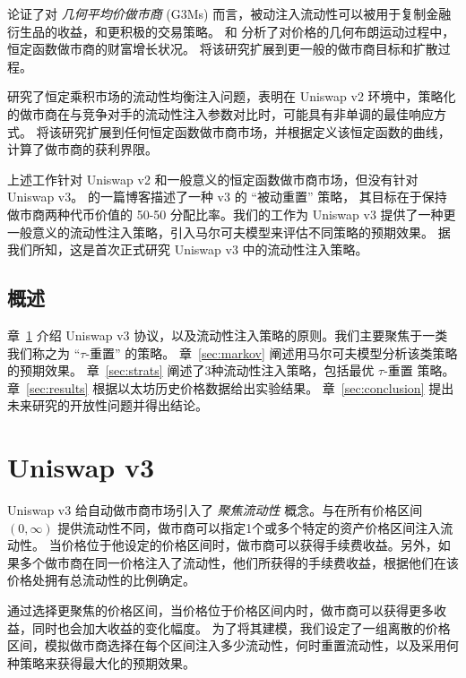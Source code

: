 \documentclass[sigconf, dvipsnames]{acmart}
\begin{document}
\citet{evans2020liquidity} 论证了对 {\em 几何平均价做市商} (G3Ms) 而言，被动注入流动性可以被用于复制金融衍生品的收益，和更积极的交易策略。
\citet{tassy2020growth} 和 \citet{uniswapsfinancialalchemy} 分析了对价格的几何布朗运动过程中，恒定函数做市商的财富增长状况。
\citet{evans2021optimal} 将该研究扩展到更一般的做市商目标和扩散过程。

\citet{aoyagi2020lazy} 研究了恒定乘积市场的流动性均衡注入问题，表明在 Uniswap v2 环境中，策略化的做市商在与竞争对手的流动性注入参数对比时，可能具有非单调的最佳响应方式。
\citet{angeris2020does} 将该研究扩展到任何恒定函数做市商市场，并根据定义该恒定函数的曲线，计算了做市商的获利界限。

上述工作针对 Uniswap v2 和一般意义的恒定函数做市商市场，但没有针对 Uniswap v3。\citet{charmalphavault} 的一篇博客描述了一种 v3 的 ``被动重置'' 策略，
其目标在于保持做市商两种代币价值的 50-50 分配比率。我们的工作为 Uniswap v3 提供了一种更一般意义的流动性注入策略，引入马尔可夫模型来评估不同策略的预期效果。
据我们所知，这是首次正式研究 Uniswap v3 中的流动性注入策略。

\subsection{概述}
\quad 章~\ref{sec:uniswap} 介绍 Uniswap v3 协议，以及流动性注入策略的原则。我们主要聚焦于一类我们称之为 ``$\tau$-重置'' 的策略。
章~\ref{sec:markov} 阐述用马尔可夫模型分析该类策略的预期效果。
章~\ref{sec:strats} 阐述了3种流动性注入策略，包括最优 $\tau$-重置 策略。
章~\ref{sec:results} 根据以太坊历史价格数据给出实验结果。
章~\ref{sec:conclusion} 提出未来研究的开放性问题并得出结论。

\section{Uniswap v3}\label{sec:uniswap}

\quad Uniswap v3 给自动做市商市场引入了 \textit{聚焦流动性} 概念。与在所有价格区间 $(0,\infty)$ 提供流动性不同，做市商可以指定1个或多个特定的资产价格区间注入流动性。
当价格位于他设定的价格区间时，做市商可以获得手续费收益。另外，如果多个做市商在同一价格注入了流动性，他们所获得的手续费收益，根据他们在该价格处拥有总流动性的比例确定。


通过选择更聚焦的价格区间，当价格位于价格区间内时，做市商可以获得更多收益，同时也会加大收益的变化幅度。
为了将其建模，我们设定了一组离散的价格区间，模拟做市商选择在每个区间注入多少流动性，何时重置流动性，以及采用何种策略来获得最大化的预期效果。
\end{document}
